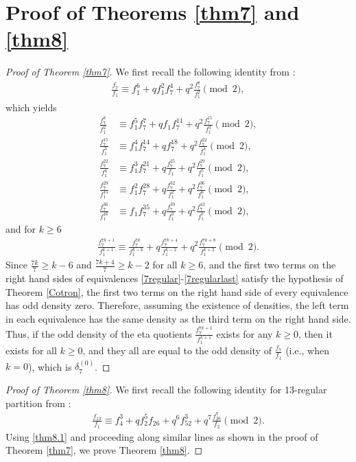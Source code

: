 \documentclass[reqno]{amsart}
\theoremstyle{definition}
\theoremstyle{remark}
\numberwithin{equation}{section}
\begin{document}
\section{Proof of  Theorems \ref{thm7} and \ref{thm8}}
\begin{proof}[Proof of Theorem \ref{thm7}]
We first recall the following identity from \cite[(9)]{Keith2021}:
\begin{align}\label{7regular}
\frac{f_7}{f_1}\equiv f^{6}_1+qf^{2}_1f^{4}_7+q^2\frac{f^{8}_7}{f^{2}_1}\pmod{2},
\end{align}
which yields
\begin{align}
\frac{f^{8}_7}{f^{2}_1}&\equiv f^{5}_1f^{7}_7+qf_1f^{11}_7+q^2\frac{f^{15}_7}{f^{3}_1}\pmod{2},\\
\frac{f^{15}_7}{f^{3}_1}&\equiv f^{4}_1f^{14}_7+qf^{18}_7+q^2\frac{f^{22}_7}{f^{4}_1}\pmod{2},\\
\frac{f^{22}_7}{f^{4}_1}&\equiv f^{3}_1f^{21}_7+q\frac{f^{25}_7}{f_1}+q^2\frac{f^{29}_7}{f^{5}_1}\pmod{2},\\
\frac{f^{29}_7}{f^{15}_1}&\equiv f^{2}_1f^{28}_7+q\frac{f^{32}_7}{f^{2}_1}+q^2\frac{f^{36}_7}{f^{6}_1}\pmod{2},\\
\frac{f^{36}_7}{f^{16}_1}&\equiv f_1f^{35}_7+q\frac{f^{39}_7}{f^{3}_1}+q^2\frac{f^{43}_7}{f^{7}_1}\pmod{2},\label{7regularlast}
\end{align}
and for $k\geq 6$
\begin{align}
\frac{f^{7k+1}_7}{f^{k+1}_1}\equiv \frac{f^{7k}_7}{f^{k-6}_1}+q\frac{f^{7k+4}_7}{f^{k-2}_1}+q^2\frac{f^{7k+8}_7}{f^{k+2}_1}\pmod{2}.
\end{align}
Since $\frac{7k}{7}\geq k-6$ and $\frac{7k+4}{7}\geq k-2$ for all $k\geq6$, and the first two terms on the right hand sides of equivalences \eqref{7regular}-\eqref{7regularlast} satisfy the hypothesis of Theorem \ref{Cotron}, 
the first two terms on the right hand side of every equivalence has odd density zero. Therefore, assuming the existence of densities, the left term in each equivalence has the same density as the third term on the right hand side. 
Thus, if the odd density of the eta quotients $\frac{f^{7k+1}_{7}}{f^{k+1}_{1}}$ exists for any $k\geq 0$, then it exists for all $k\geq 0$, and they all are equal to the odd density of $\frac{f_7}{f_1}$ (i.e., when $k=0$), which is $\delta^{(0)}_{7}$.
\end{proof}
\begin{proof}[Proof of Theorem \ref{thm8}]
We first recall the following identity for 13-regular partition from \cite[(3)]{calkin}:
\begin{align}\label{thm8.1}
\frac{f_{13}}{f_1}\equiv f^{3}_4+qf^{5}_2f_{26}+q^6f^{3}_{52}+q^7\frac{f^{7}_{26}}{f_{2}}\pmod{2}.
\end{align}
Using \eqref{thm8.1} and proceeding along similar lines as shown in the proof of Theorem \ref{thm7}, we prove Theorem \ref{thm8}.
\end{proof}
\end{document}
